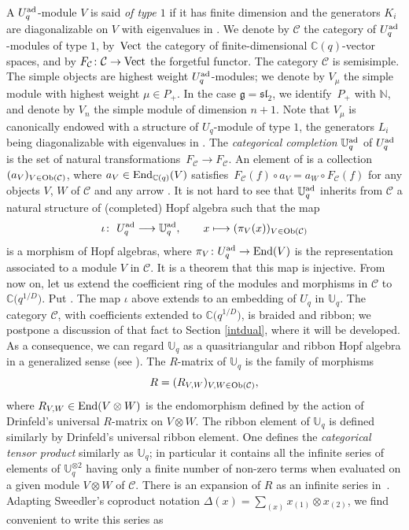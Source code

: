 \documentclass[10pt,a4paper]{amsart}
\numberwithin{equation}{section}
\theoremstyle{definition}
\newcommand{\mUq}{\mathbb{U}_q}
\newcommand{\mc}{\mathbb{C}}
\newcommand{\mz}{\mathbb{Z}}
\newcommand{\ra}{\rightarrow}
\begin{document}
A $U_q^{\rm ad}$-module $V$ is said {\it of type $1$} if it has finite dimension and the generators $K_i$ are diagonalizable on $V$ with eigenvalues in \smash{$q_i^{\mz}$}. We denote by $\mathcal{C}$ the category of $U_q^{\rm ad}$-modules of type $1$, by~${\rm Vect}$ the category of finite-dimensional $\mc(q)$-vector spaces, and by $F_{\mathcal C}\colon{\mathcal C}\to {\rm Vect}$ the forgetful functor. The category $\mathcal{C}$ is semisimple. The simple objects are highest weight $U_q^{\rm ad}$-modules; we denote by $V_\mu$ the simple module with highest weight $\mu\in P_+$. In the case $\mathfrak{g}={\mathfrak{sl}_2}$, we identify~$P_+$ with $\mathbb{N}$, and denote by $V_n$ the simple module of dimension $n+1$. Note that $V_\mu$ is canonically endowed with a structure of $U_q$-module of type $1$, the generators $L_i$ being diagonalizable with eigenvalues in \smash{$q_i^{\mz/D}$}. The {\it categorical completion} $\mUq^{\rm ad}$ of $U_q^{\rm ad}$ is the set of natural transformations~${F_{\mathcal C}\ra F_{\mathcal C}}$. An element of \smash{$\mUq^{\rm ad}$} is a collection $(a_V)_{V\in {\rm Ob}(\mathcal{C})}$, where $a_V\in {\rm End}_{\mc(q)}(V)$ satisfies~${F_{\mathcal C}(f)\circ a_V=a_W\circ F_{\mathcal C}(f)}$ for any objects $V$, $W$ of $\mathcal{C}$ and any arrow . It is not hard to see that $\mUq^{\rm ad}$ inherits from $\mathcal{C}$ a natural structure of (completed) Hopf algebra such that the map
\begin{gather}\label{defiota}
\iota\colon\ U_q^{\rm ad} \longrightarrow \mUq^{\rm ad}, \qquad x\longmapsto(\pi_V(x))_{V\in {\rm Ob}(\mathcal{C})}
\end{gather}
is a morphism of Hopf algebras, where $\pi_V\colon U_q^{\rm ad} \ra {\rm End}(V)$ is the representation associated to a module $V$ in $\mathcal{C}$. It is a theorem that this map is injective. From now on, let us extend the coefficient ring of the modules and morphisms in $\mathcal{C}$ to $\mc\big(q^{1/D}\big)$. Put \smash{$\mUq = \mUq^{\rm ad} \bigotimes_{\mc(q)} \mc\big(q^{1/D}\big)$}.
The map $\iota$ above extends to an embedding of $U_q$ in $\mUq$. The category $\mathcal{C}$, with coefficients extended to $\mc\big(q^{1/D}\big)$, is braided and ribbon; we postpone a discussion of that fact to Section \ref{intdual}, where it will be developed. As a consequence, we can regard $\mUq$ as a quasitriangular and ribbon Hopf algebra in a generalized sense (see \cite{BR}). The $R$-matrix of $\mUq$ is the family of morphisms
\[R = (R_{V,W})_{V,W\in {\rm Ob}(\mathcal{C})},\]
where $R_{V,W}\in {\rm End}(V\otimes W)$ is the endomorphism defined by the action of Drinfeld's universal $R$-matrix on $V\otimes W$. The ribbon element of $\mUq$ is defined similarly by Drinfeld's universal ribbon element. One defines the {\it categorical tensor product} \smash{$\mUq^{\hat{\otimes} 2}$} similarly as $\mUq$; in particular it contains all the infinite series of elements of $\mUq^{\otimes 2}$ having only a finite number of non-zero terms when evaluated on a given module $V\otimes W$ of $\mathcal{C}$. There is an expansion of $R$ as an infinite series in~\smash{$\mUq^{\hat{\otimes} 2}$}. Adapting Sweedler's coproduct notation $ \Delta(x)=\sum_{(x)}x_{(1)}\otimes x_{(2)}$, we find convenient to write this series as
\end{document}
